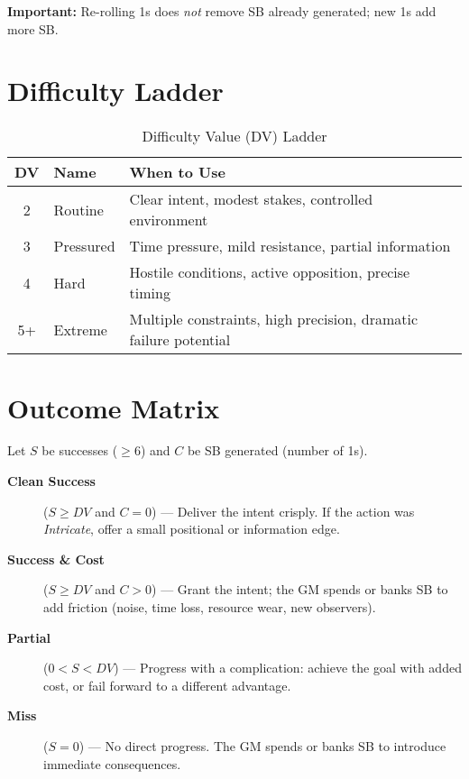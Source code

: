 \noindent\textbf{Important:} Re-rolling 1s does \emph{not} remove SB already generated; new 1s add more SB. 

\section{Difficulty Ladder}
\label{sec:difficulty-ladder}

\begin{table}[htbp]
\centering
\begin{tabular}{clp{8cm}}
\toprule
\textbf{DV} & \textbf{Name} & \textbf{When to Use} \\
\midrule
2 & Routine & Clear intent, modest stakes, controlled environment \\
3 & Pressured & Time pressure, mild resistance, partial information \\
4 & Hard & Hostile conditions, active opposition, precise timing \\
5+ & Extreme & Multiple constraints, high precision, dramatic failure potential \\
\bottomrule
\end{tabular}
\caption{Difficulty Value (DV) Ladder}
\label{tab:difficulty-ladder}
\end{table}

\section{Outcome Matrix}
\label{sec:outcome-matrix}

Let $S$ be successes ($\geq 6$) and $C$ be SB generated (number of 1s).

\begin{description}
\item[\textbf{Clean Success}] ($S \geq DV$ and $C = 0$) — Deliver the intent crisply. If the action was \emph{Intricate}, offer a small positional or information edge. 
\item[\textbf{Success \& Cost}] ($S \geq DV$ and $C > 0$) — Grant the intent; the GM spends or banks SB to add friction (noise, time loss, resource wear, new observers). 
\item[\textbf{Partial}] ($0 < S < DV$) — Progress with a complication: achieve the goal with added cost, or fail forward to a different advantage. 
\item[\textbf{Miss}] ($S = 0$) — No direct progress. The GM spends or banks SB to introduce immediate consequences. 
\end{description}

